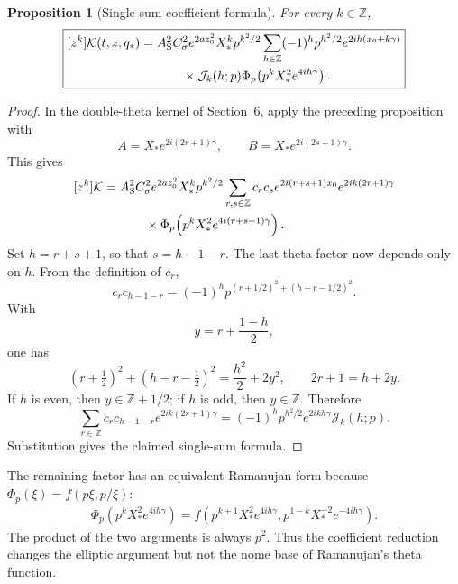 \documentclass[11pt]{article}
\newtheorem{proposition}{Proposition}[section]
\numberwithin{equation}{section}
\begin{document}
\begin{proposition}[Single-sum coefficient formula]
For every $k\in\mathbb Z$,
\begin{equation}
\boxed{
\begin{aligned}
[z^k]\mathcal K(t,z;q_\ast)
={}&A_{\rm S}^2C_\sigma^2e^{2az_0^2}
X_\ast^kp^{k^2/2}
\sum_{h\in\mathbb Z}(-1)^hp^{h^2/2}e^{2ih(x_0+k\gamma)}\\
&\qquad\times\mathcal J_k(h;p)
\Phi_p\!\left(p^kX_\ast^2e^{4ih\gamma}\right).
\end{aligned}}
\end{equation}
\end{proposition}
\begin{proof}
In the double-theta kernel of Section~6, apply the preceding proposition with
\begin{equation}
A=X_\ast e^{2i(2r+1)\gamma},\qquad
B=X_\ast e^{2i(2s+1)\gamma}.
\end{equation}
This gives
\begin{equation}
\begin{aligned}
[z^k]\mathcal K
={}&A_{\rm S}^2C_\sigma^2e^{2az_0^2}X_\ast^kp^{k^2/2}
\sum_{r,s\in\mathbb Z}c_rc_s e^{2i(r+s+1)x_0}
 e^{2ik(2r+1)\gamma}\\
&\qquad\times
\Phi_p\!\left(p^kX_\ast^2e^{4i(r+s+1)\gamma}\right).
\end{aligned}
\end{equation}
Set $h=r+s+1$, so that $s=h-1-r$.  The last theta factor now depends only
on $h$.  From the definition of $c_r$,
\begin{equation}
c_rc_{h-1-r}
=(-1)^h p^{(r+1/2)^2+(h-r-1/2)^2}.
\end{equation}
With
\begin{equation}
y=r+\frac{1-h}{2},
\end{equation}
one has
\begin{equation}
(r+\tfrac12)^2+(h-r-\tfrac12)^2=\frac{h^2}{2}+2y^2,
\qquad 2r+1=h+2y.
\end{equation}
If $h$ is even, then $y\in\mathbb Z+1/2$; if $h$ is odd, then
$y\in\mathbb Z$.  Therefore
\begin{equation}
\sum_{r\in\mathbb Z}c_rc_{h-1-r}e^{2ik(2r+1)\gamma}
=(-1)^hp^{h^2/2}e^{2ikh\gamma}\mathcal J_k(h;p).
\end{equation}
Substitution gives the claimed single-sum formula.
\end{proof}

The remaining factor has an equivalent Ramanujan form because
$\Phi_p(\xi)=f(p\xi,p/\xi)$:
\begin{equation}
\begin{aligned}
\Phi_p\!\left(p^kX_\ast^2e^{4ih\gamma}\right)
=f\!\left(
 p^{k+1}X_\ast^2e^{4ih\gamma},
 p^{1-k}X_\ast^{-2}e^{-4ih\gamma}
\right).
\end{aligned}
\end{equation}
The product of the two arguments is always $p^2$.  Thus the coefficient
reduction changes the elliptic argument but not the nome base of Ramanujan's
theta function.
\end{document}
